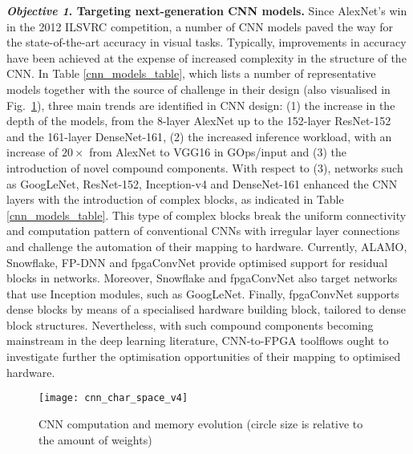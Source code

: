 \documentclass[format=acmsmall, review=false, screen=true]{acmart}
\begin{document}
\textbf{\textit{Objective 1}. Targeting next-generation CNN models.}
Since AlexNet's win in the 2012 ILSVRC competition, a number of CNN models \cite{Zeiler_2014}\cite{Simonyan14c}\cite{Szegedy2014}\cite{He_2016}\cite{Szegedy_2016}\cite{huang2017densely} paved the way for the state-of-the-art accuracy in visual tasks. Typically, improvements in accuracy have been achieved at the expense of increased complexity in the structure of the CNN. In Table \ref{cnn_models_table}, which lists a number of representative models together with the source of challenge in their design (also visualised in \mbox{Fig. \ref{fig:cnn_schar_space}}), three main trends are identified in CNN design: (1) the increase in the depth of the models, from the 8-layer AlexNet up to the 152-layer ResNet-152 {\color{black}and the 161-layer DenseNet-161}, (2) the increased inference workload, with an increase of $20 \times$ from AlexNet to VGG16 in GOps/input and (3) the introduction of novel compound components. With respect to (3), networks such as GoogLeNet, ResNet-152, Inception-v4 and {\color{black}DenseNet-161} enhanced the CNN layers with the introduction of complex blocks, as indicated in Table \ref{cnn_models_table}. This type of complex blocks break the uniform connectivity and computation pattern of conventional CNNs with irregular layer connections and challenge the automation of their mapping to hardware. {\color{black}Currently, ALAMO, Snowflake, FP-DNN and fpgaConvNet provide optimised support for residual blocks in networks. Moreover, Snowflake and fpgaConvNet also target networks that use Inception modules, such as GoogLeNet. Finally, fpgaConvNet supports dense blocks by means of a specialised hardware building block, tailored to dense block structures. Nevertheless, with such compound components becoming mainstream in the deep learning literature, CNN-to-FPGA toolflows ought to investigate further the optimisation opportunities of their mapping to optimised hardware.}

\begin{figure}[t] %
 	\vspace{-0.2cm}
	\centering
	\texttt{[image: cnn\_char\_space\_v4]}
	\vspace{-0.5cm}
	\caption{CNN computation and memory evolution (circle size is relative to the amount of weights)}
	\label{fig:cnn_schar_space}
	\vspace{-0.5cm}
\end{figure}

\end{document}
